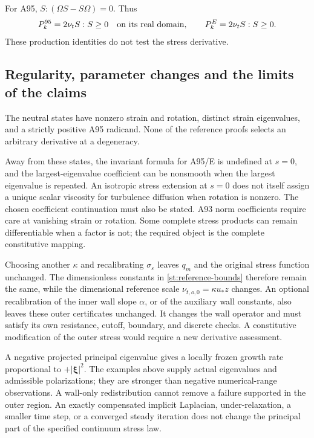 \documentclass[11pt,a4paper]{article}
\numberwithin{equation}{section}
\newcommand{\eps}{\varepsilon}
\newcommand{\ust}{u_*}
\newcommand{\nut}{\nu_t}
\begin{document}
For A95, $S:(\Omega S-S\Omega)=0$. Thus
\begin{equation}
 P_k^{95}=2\nut S:S\ge0
 \quad\hbox{on its real domain},\qquad
 P_k^E=2\nut S:S\ge0 .
 \label{st:positive-production}
\end{equation}
These production identities do not test the stress derivative.

\subsection{Regularity, parameter changes and the limits of the claims}
\label{st:scope}

The neutral states have nonzero strain and rotation, distinct strain
eigenvalues, and a strictly positive A95 radicand. None of the
reference proofs selects an arbitrary derivative at a degeneracy.

Away from these states, the invariant formula for A95/E is undefined
at $s=0$, and the largest-eigenvalue coefficient can be nonsmooth
when the largest eigenvalue is repeated. An isotropic stress
extension at $s=0$ does not itself assign a unique scalar viscosity
for turbulence diffusion when rotation is nonzero. The chosen
coefficient continuation must also be stated. A93 norm coefficients
require care at vanishing strain or rotation. Some complete stress
products can remain differentiable when a factor is not; the
required object is the complete constitutive mapping.

Choosing another $\kappa$ and recalibrating $\sigma_\eps$ leaves
$q_m$ and the original stress function unchanged. The dimensionless
constants in \cref{st:reference-bounds} therefore remain the same,
while the dimensional reference scale
$\nu_{t,o,0}=\kappa\ust z$ changes. An optional recalibration of the
inner wall slope $\alpha$, or of the auxiliary wall constants,
also leaves these outer certificates unchanged. It changes the
wall operator and must satisfy its own resistance, cutoff,
boundary, and discrete checks. A constitutive modification of
the outer stress would require a new derivative assessment.

A negative projected principal eigenvalue gives a locally frozen
growth rate proportional to $+|\boldsymbol\xi|^2$. The examples
above supply actual eigenvalues and admissible polarizations;
they are stronger than negative numerical-range observations.
A wall-only redistribution cannot remove a failure supported in
the outer region. An exactly compensated implicit Laplacian,
under-relaxation, a smaller time step, or a converged steady
iteration does not change the principal part of the specified
continuum stress law.
\end{document}
